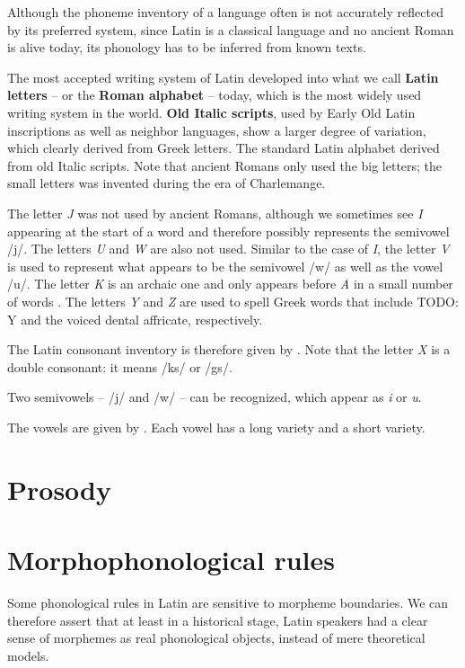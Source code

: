 \documentclass[a4paper, oneside]{report}
\newcommand*{\citechap}[1]{chap.~{#1}}
\newcommand*{\citetable}[1]{Table~{#1}}
\newcommand*{\concept}[1]{\textbf{#1}}
\newcommand{\form}[1]{\emph{#1}}
\begin{document}
Although the phoneme inventory of a language 
often is not accurately reflected by its preferred system, 
since Latin is a classical language 
and no ancient Roman is alive today, 
its phonology has to be inferred from known texts. 

The most accepted writing system of Latin developed into 
what we call \concept{Latin letters} -- or the \concept{Roman alphabet} -- today, 
which is the most widely used writing system in the world.
\concept{Old Italic scripts},
used by Early Old Latin inscriptions 
as well as neighbor languages,
show a larger degree of variation, 
which clearly derived from Greek letters.
The standard Latin alphabet derived from old Italic scripts.
Note that ancient Romans only used the big letters;
the small letters was invented during the era of Charlemange.

The letter \form{J} was not used by ancient Romans, 
although we sometimes see \form{I} appearing at the start of a word 
and therefore possibly represents the semivowel /j/.
The letters \form{U} and \form{W} are also not used.
Similar to the case of \form{I},
the letter \form{V} is used to represent 
what appears to be the semivowel /w/ 
as well as the vowel /u/. 
The letter \form{K} is an archaic one 
and only appears before \form{A} in a small number of words
\citep[\citechap{2}]{oniga2014latin}.
The letters \form{Y} and \form{Z} are used to spell Greek words that 
include TODO: Y and the voiced dental affricate, respectively.

The Latin consonant inventory is therefore given by \citet[\citetable{3.1}]{oniga2014latin}.
Note that the letter \form{X} is a double consonant: 
it means /ks/ or /gs/.

Two semivowels -- /j/ and /w/ -- can be recognized,
which appear as \form{i} or \form{u}.

The vowels are given by \citet[\citetable{3.2}]{oniga2014latin}.
Each vowel has a long variety and a short variety.

\section{Prosody}



\section{Morphophonological rules}\label{sec:phonology.morphological}

Some phonological rules in Latin are sensitive to morpheme boundaries.
We can therefore assert that at least in a historical stage, 
Latin speakers had a clear sense of morphemes 
as real phonological objects,
instead of mere theoretical models.
\end{document}
